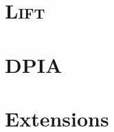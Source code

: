\documentclass[
  nonacm,
  format=acmsmall,
  screen=true,
  timestamp=true
]{acmart}
\newcommand{\Lift}{\textsc{Lift}\xspace}
\begin{document}
\maketitle

\clearpage
\section{\Lift}






\renewcommand{\readacc}{\mathsf{read}}
\renewcommand{\writeacc}{\mathsf{write}}
\renewcommand{\type}{\mathsf{phrase}}

\clearpage
\section{DPIA}

\newcommand{\ei}{\prim{idx}~n~\dtone~\mathit{xs}~i}
\newcommand{\ea}{\prim{idxAcc}~n~\dttwo~\mathit{out}~i}

\newcommand{\codegenComm}[1]{\textsc{CodeGen}_{\mathsf{comm}}(#1)}
\newcommand{\codegenAcc}[2]{\textsc{CodeGen}_{\mathsf{acc}[#1]}(#2)}
\newcommand{\codegenExp}[2]{\textsc{CodeGen}_{\mathsf{exp}[#1]}(#2)}
\newcommand{\codegenData}[1]{\textsc{CodeGen}_{\mathsf{\datatype}}(#1)}












\clearpage

\section{Extensions}



\end{document}
